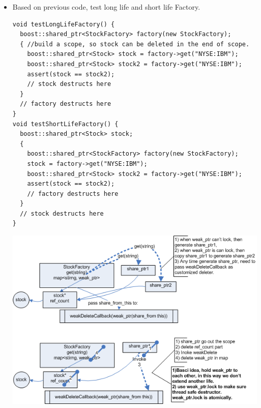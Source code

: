 \documentclass[a4paper,11pt,twoside]{book}
\begin{document}
\begin{itemize}
		\item Based on previous code, test long life and short life Factory. 
\begin{lstlisting}
void testLongLifeFactory() {
  boost::shared_ptr<StockFactory> factory(new StockFactory);
  { //build a scope, so stock can be deleted in the end of scope.
    boost::shared_ptr<Stock> stock = factory->get("NYSE:IBM");
    boost::shared_ptr<Stock> stock2 = factory->get("NYSE:IBM");
    assert(stock == stock2); 
    // stock destructs here
  }
  // factory destructs here
}
void testShortLifeFactory() {
  boost::shared_ptr<Stock> stock;
  {
    boost::shared_ptr<StockFactory> factory(new StockFactory);
    stock = factory->get("NYSE:IBM");
    boost::shared_ptr<Stock> stock2 = factory->get("NYSE:IBM");
    assert(stock == stock2);
    // factory destructs here
  }
  // stock destructs here
}
\end{lstlisting}
	\begin{center}	
		\includegraphics[width=0.90\linewidth]{pics/weak_ptr.png}
		\end{center}

\end{itemize}
\end{document}
